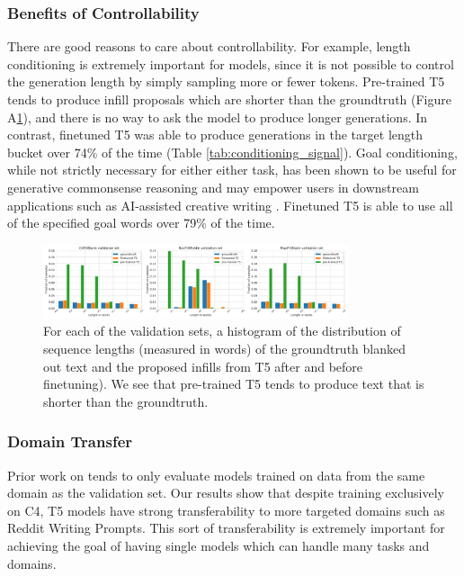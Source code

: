 \subsubsection{Benefits of Controllability}
There are good reasons to care about controllability.
For example, length conditioning is extremely important for \FitB models, since it is not possible to control the generation length by simply sampling more or fewer tokens.
Pre-trained T5 tends to produce infill proposals which are shorter than the groundtruth (Figure A\ref{fig:t5_lengths}), and there is no way to ask the model to produce longer generations.
In contrast, finetuned T5 was able to produce generations in the target length bucket over 74\% of the time (Table \ref{tab:conditioning_signal}).
Goal conditioning, while not strictly necessary for either either task, has been shown to be useful for generative commonsense reasoning \citep{lin2020commongen} and may empower users in downstream applications such as AI-assisted creative writing \citep{roemmele2021inspiration}. 
Finetuned T5 is able to use all of the specified goal words over 79\% of the time.


\begin{figure}
    \centering
    \includegraphics[width=0.8\textwidth]{figures/t5_lengths}
    \caption{For each of the \FitB{} validation sets, a histogram of the distribution of sequence lengths (measured in words) of the {groundtruth} blanked out text and the proposed infills from T5 {after} and {before} finetuning). We see that pre-trained T5 tends to produce text that is shorter than the groundtruth.}
    \label{fig:t5_lengths}
\end{figure}

\subsubsection{Domain Transfer}
Prior work on \FitB{} tends to only evaluate models trained on data from the same domain as the validation set.
Our results show that despite training exclusively on C4, T5 models have strong transferability to more targeted domains such as Reddit Writing Prompts.
This sort of transferability is extremely important for achieving the goal of having single models which can handle many tasks and domains.

